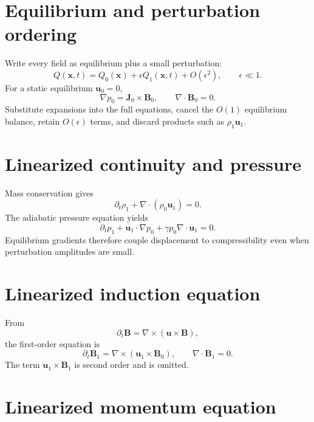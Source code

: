 \documentclass[11pt]{article}
\begin{document}
\section{Equilibrium and perturbation ordering}

Write every field as equilibrium plus a small perturbation:
\begin{equation}
Q(\mathbf x,t)=Q_0(\mathbf x)+\epsilon Q_1(\mathbf x,t)+O(\epsilon^2),
\qquad \epsilon\ll1.
\end{equation}
For a static equilibrium $\mathbf u_0=0$,
\begin{equation}
\nabla p_0=\mathbf J_0\times\mathbf B_0,\qquad
\nabla\cdot\mathbf B_0=0.
\end{equation}
Substitute expansions into the full equations, cancel the $O(1)$ equilibrium balance, retain $O(\epsilon)$ terms, and discard products such as $\rho_1\mathbf u_1$.


\section{Linearized continuity and pressure}

Mass conservation gives
\begin{equation}
\partial_t\rho_1+\nabla\cdot(\rho_0\mathbf u_1)=0.
\end{equation}
The adiabatic pressure equation yields
\begin{equation}
\partial_tp_1+\mathbf u_1\cdot\nabla p_0
+\gamma p_0\nabla\cdot\mathbf u_1=0.
\end{equation}
Equilibrium gradients therefore couple displacement to compressibility even when perturbation amplitudes are small.


\section{Linearized induction equation}

From
\begin{equation}
\partial_t\mathbf B=\nabla\times(\mathbf u\times\mathbf B),
\end{equation}
the first-order equation is
\begin{equation}
\partial_t\mathbf B_1=\nabla\times(\mathbf u_1\times\mathbf B_0),
\qquad
\nabla\cdot\mathbf B_1=0.
\end{equation}
The term $\mathbf u_1\times\mathbf B_1$ is second order and is omitted.


\section{Linearized momentum equation}
\end{document}
